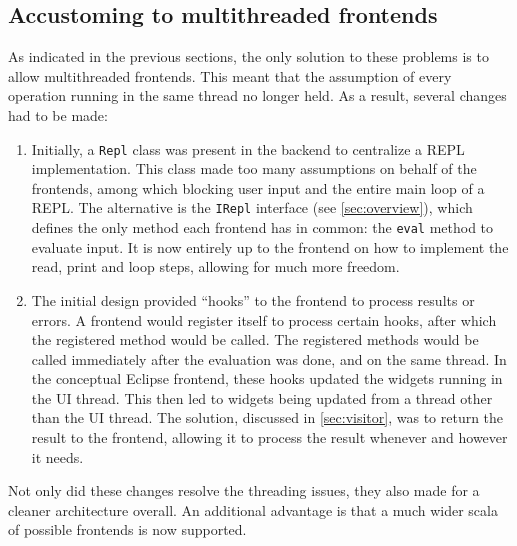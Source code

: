 \subsection{Accustoming to multithreaded frontends}

As indicated in the previous sections, the only solution to these problems is to
allow multithreaded frontends. This meant that the assumption of every
operation running in the same thread no longer held. As a result, several
changes had to be made:

\begin{enumerate}
  \item Initially, a \texttt{Repl} class was present in the backend to
  centralize a REPL implementation. This class made too many assumptions on
  behalf of the frontends, among which blocking user input and the entire main
  loop of a REPL. The alternative is the \texttt{IRepl} interface (see
  \cref{sec:overview}), which defines the only method each frontend has in
  common: the \texttt{eval} method to evaluate input. It is now entirely up to
  the frontend on how to implement the read, print and loop steps, allowing for
  much more freedom.
  \item	The initial design provided ``hooks'' to the frontend to process results or
  errors. A frontend would register itself to process certain hooks, after which
  the registered method would be called. The registered methods would be called
  immediately after the evaluation was done, and on the same thread. In the
  conceptual Eclipse frontend, these hooks updated the widgets running in the UI
  thread. This then led to widgets being updated from a thread other than the UI
  thread. The solution, discussed in \cref{sec:visitor}, was to return the
  result to the frontend, allowing it to process the result whenever and however
  it needs.
\end{enumerate}

Not only did these changes resolve the threading issues, they also made for a
cleaner architecture overall. An additional advantage is that a much wider scala
of possible frontends is now supported.

